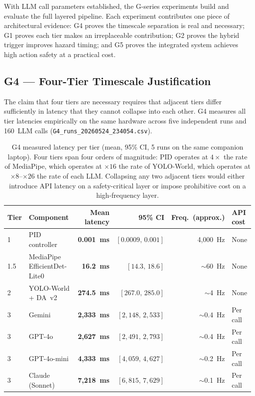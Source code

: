 With LLM call parameters established, the G-series experiments build and
evaluate the full layered pipeline. Each experiment contributes one piece of
architectural evidence: G4 proves the timescale separation is real and
necessary; G1 proves each tier makes an irreplaceable contribution; G2 proves
the hybrid trigger improves hazard timing; and G5 proves the integrated system
achieves high action safety at a practical cost.

\subsection{G4 --- Four-Tier Timescale Justification}
\label{sec:ch2_g4}

The claim that four tiers are necessary requires that adjacent tiers differ
sufficiently in latency that they cannot collapse into each other. G4 measures
all tier latencies empirically on the same hardware across five independent
runs and 160~LLM calls (\texttt{G4\_runs\_20260524\_234054.csv}).

\begin{table}[ht]
  \caption{G4 measured latency per tier (mean, 95\% CI, 5 runs on the same
    companion laptop). Four tiers span four orders of magnitude: PID operates
    at $4\times$ the rate of MediaPipe, which operates at $\times16$ the rate
    of YOLO-World, which operates at $\times8$--$\times26$ the rate of each LLM.
    Collapsing any two adjacent tiers would either introduce API latency on a
    safety-critical layer or impose prohibitive cost on a high-frequency layer.}
  \label{tab:ch2_g4}
  \centering
  \small
  \begin{tabular}{llrrrl}
    \toprule
    Tier & Component & Mean latency & 95\% CI & Freq.\ (approx.) & API cost \\
    \midrule
    1   & PID controller                & \textbf{0.001~ms} & $[0.0009,\,0.001]$      & 4,000~Hz & None \\
    1.5 & MediaPipe EfficientDet-Lite0  & \textbf{16.2~ms}  & $[14.3,\,18.6]$         & $\sim$60~Hz & None \\
    2   & YOLO-World + DA~v2            & \textbf{274.5~ms} & $[267.0,\,285.0]$       & $\sim$4~Hz  & None \\
    3   & Gemini                        & \textbf{2,333~ms} & $[2{,}148,\,2{,}533]$   & $\sim$0.4~Hz & Per call \\
    3   & GPT-4o                        & \textbf{2,627~ms} & $[2{,}491,\,2{,}793]$   & $\sim$0.4~Hz & Per call \\
    3   & GPT-4o-mini                   & \textbf{4,333~ms} & $[4{,}059,\,4{,}627]$   & $\sim$0.2~Hz & Per call \\
    3   & Claude (Sonnet)               & \textbf{7,218~ms} & $[6{,}815,\,7{,}629]$   & $\sim$0.1~Hz & Per call \\
    \bottomrule
  \end{tabular}
\end{table}

